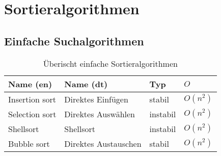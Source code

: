 



\section{Sortieralgorithmen}

\subsection{Einfache Suchalgorithmen}

\begin{table}[h!]
        \centering
        \begin{tabular}{l l l l}
                Name (en)
			& Name (dt) 
			& Typ
			& $O$ \\
                \hline
                Insertion sort
			& Direktes Einfügen
			& stabil       
			& $O(n^2)$ \\
                Selection sort 
			& Direktes Auswählen      
			& instabil       
			& $O(n^2)$ \\
                Shellsort   
			& Shellsort    
			& instabil       
			& $O(n^2)$ \\
                Bubble sort   
			& Direktes Austauschen   
			& stabil        
			& $O(n^2)$
        \end{tabular}
        \caption{Überischt einfache Sortieralgorithmen}
        \label{table:sorting-algorithms}
\end{table}
